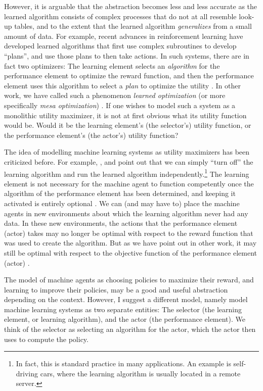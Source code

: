 However, it is arguable that the abstraction becomes less and less accurate as the learned algorithm consists of complex processes that do not at all resemble look-up tables, and to the extent that the learned algorithm \textit{generalizes} from a small amount of data. For example, recent advances in reinforcement learning have developed learned algorithms that first use complex subroutines to develop “plans”, and use those plans to then take actions. In such systems, there are in fact two optimizers: The learning element selects an \textit{algorithm} for the performance element to optimize the reward function, and then the performance element uses this algorithm to select a \textit{plan} to optimize the utility \citep{Srinivas2018, Li2017}. In other work, we have called such a phenomenon \textit{learned optimization} (or more specifically \textit{mesa optimization}) \citep{Hubinger2019}. If one wishes to model such a system as a monolithic utility maximizer, it is not at first obvious what its utility function would be. Would it be the learning element's (the selector's) utility function, or the performance element's (the actor's) utility function?

The idea of modelling machine learning systems as utility maximizers has been criticized before. For example, \cite{Drexler2019}, and \cite{Hubinger2019} point out that we can simply “turn off” the learning algorithm and run the learned algorithm independently.\footnote{In fact, this is standard practice in many applications. An example is self-driving cars, where the learning algorithm is usually located in a remote server. } The learning element is not necessary for the machine agent to function competently once the algorithm of the performance element has been determined, and keeping it activated is entirely optional \citep{Drexler2019}. We can (and may have to) place the machine agents in new environments about which the learning algorithm never had any data. In these new environments, the actions that the performance element (actor) takes may no longer be optimal with respect to the reward function that was used to create the algorithm. But as we have point out in other work, it may still be optimal with respect to the objective function of the performance element (actor) \citep{Hubinger2019}. 

The model of machine agents as choosing policies to maximize their reward, and learning to improve their policies, may be a good and useful abstraction depending on the context. However, I suggest a different model, namely model machine learning systems as two separate entities: The selector (the learning element, or learning algorithm), and the actor (the performance element). We think of the selector as selecting an algorithm for the actor, which the actor then uses to compute the policy. 






